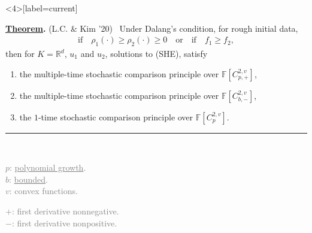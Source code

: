 \documentclass[9pt,table,xcolor=dvipsnames]{beamer}%
\newcommand{\bbF}{\mathbb{F}}
\newcommand{\R}{\mathbb{R}}
\theoremstyle{definition}
\theoremstyle{plain}
\begin{document}
\begin{frame}<4>[label=current]

{\noindent\bf \underline{Theorem}.} (L.C. \& Kim '20)~
Under Dalang's condition, for rough initial data,
\begin{gather*}
  \text{if} \quad \rho_1(\cdot)\ge \rho_2(\cdot)\ge 0\quad\text{or}\quad\text{if}\quad f_1\ge f_2,
\end{gather*}
then for $K=\R^d$, $u_1$ and $u_2$, solutions to (SHE), satisfy  \pause
\vspace{1em}
\begin{enumerate}
  \item the multiple-time stochastic comparison principle over $\bbF[C_{p,+}^{2,v}]$,
    \medskip
  \item the multiple-time stochastic comparison principle over $\bbF[C^{2,v}_{b,-}]$,
    \medskip
  \item the $1$-time stochastic comparison principle over $\bbF[C^{2,v}_p]$.
\end{enumerate}
\vfill
\noindent\textcolor{gray}{\rule{4cm}{0.6pt}}\\[0.3em]
\begin{minipage}{0.3\textwidth}
  \textcolor{gray}{
  \footnotesize
  $p$: \underline{polynomial growth}. \\
  $b$: \underline{bounded}.\\
  $v$: convex functions.}
\end{minipage}
\begin{minipage}{0.45\textwidth}
  \textcolor{gray}{
  \footnotesize
  $+$: first derivative nonnegative.\\
  $-$: first derivative nonpositive.\\
  \phantom{aaa}}
\end{minipage}
\end{frame}
\end{document}
